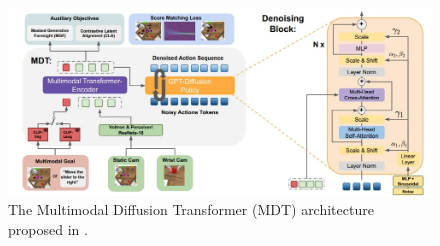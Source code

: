 \begin{figure}[t]
    \centering
    \includegraphics[width=\textwidth]{figures/images/mdt/mdt_architecture.jpg}
    \caption{The Multimodal Diffusion Transformer (MDT) architecture proposed in \cite{reuss2024multimodal}.}
    \label{fig:mdt_architecture}
\end{figure}